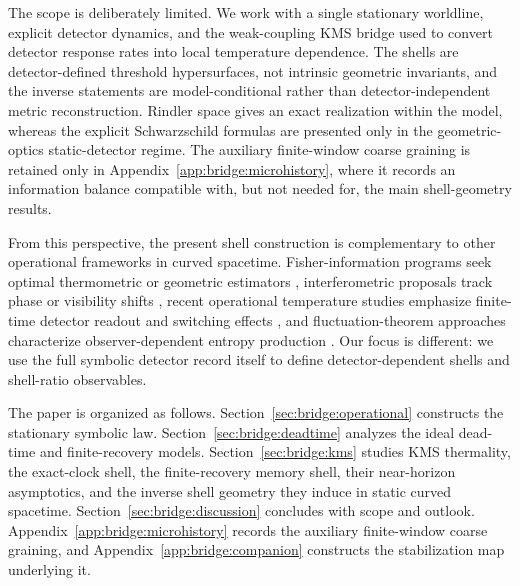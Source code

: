 The scope is deliberately limited. We work with a single stationary worldline, explicit detector dynamics, and the weak-coupling KMS bridge used to convert detector response rates into local temperature dependence. The shells are detector-defined threshold hypersurfaces, not intrinsic geometric invariants, and the inverse statements are model-conditional rather than detector-independent metric reconstruction. Rindler space gives an exact realization within the model, whereas the explicit Schwarzschild formulas are presented only in the geometric-optics static-detector regime. The auxiliary finite-window coarse graining is retained only in Appendix~\ref{app:bridge:microhistory}, where it records an information balance compatible with, but not needed for, the main shell-geometry results.

From this perspective, the present shell construction is complementary to other operational frameworks in curved spacetime. Fisher-information programs seek optimal thermometric or geometric estimators \cite{FengZhang2022QFI,DuMann2021AdS}, interferometric proposals track phase or visibility shifts \cite{CostaEtAl2020Ramsey}, recent operational temperature studies emphasize finite-time detector readout and switching effects \cite{ShallueCarroll2025}, and fluctuation-theorem approaches characterize observer-dependent entropy production \cite{BassoMazieroCeleri2025}. Our focus is different: we use the full symbolic detector record itself to define detector-dependent shells and shell-ratio observables.

The paper is organized as follows. Section~\ref{sec:bridge:operational} constructs the stationary symbolic law. Section~\ref{sec:bridge:deadtime} analyzes the ideal dead-time and finite-recovery models. Section~\ref{sec:bridge:kms} studies KMS thermality, the exact-clock shell, the finite-recovery memory shell, their near-horizon asymptotics, and the inverse shell geometry they induce in static curved spacetime. Section~\ref{sec:bridge:discussion} concludes with scope and outlook. Appendix~\ref{app:bridge:microhistory} records the auxiliary finite-window coarse graining, and Appendix~\ref{app:bridge:companion} constructs the stabilization map underlying it.
